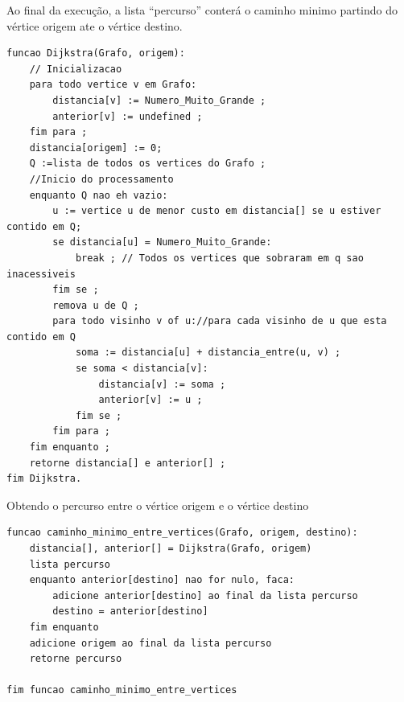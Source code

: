 \documentclass[a4paper,10pt]{article}
\newcommand{\code}[2]{
  \hrulefill
  \subsection*{#1}
  
  \vspace{2em}
}
\begin{document}
{Ao final da execução, a lista ``percurso'' conterá o caminho minimo partindo do vértice origem ate o vértice destino.
\begin{lstlisting}[morekeywords={*,:,:,[,], se, de, para, todo, fim para, enquanto, nao, eh, retorne}, captionpos=b]
funcao Dijkstra(Grafo, origem):
    // Inicializacao
    para todo vertice v em Grafo:
        distancia[v] := Numero_Muito_Grande ;
        anterior[v] := undefined ;
    fim para ;
    distancia[origem] := 0;
    Q :=lista de todos os vertices do Grafo ;
    //Inicio do processamento
    enquanto Q nao eh vazio:              
        u := vertice u de menor custo em distancia[] se u estiver contido em Q;   
        se distancia[u] = Numero_Muito_Grande:
            break ; // Todos os vertices que sobraram em q sao inacessiveis
        fim se ;
        remova u de Q ;
        para todo visinho v of u://para cada visinho de u que esta contido em Q
            soma := distancia[u] + distancia_entre(u, v) ;
            se soma < distancia[v]:  
                distancia[v] := soma ;
                anterior[v] := u ;
            fim se ;
        fim para ;
    fim enquanto ;
    retorne distancia[] e anterior[] ;
fim Dijkstra.
\end{lstlisting}

Obtendo o percurso entre o vértice origem e o vértice destino
\begin{lstlisting}[morekeywords={*,:,:,[,], se, de, para, todo, fim para, enquanto, nao, eh, retorne}, captionpos=b]
funcao caminho_minimo_entre_vertices(Grafo, origem, destino):
    distancia[], anterior[] = Dijkstra(Grafo, origem)
    lista percurso
    enquanto anterior[destino] nao for nulo, faca:
        adicione anterior[destino] ao final da lista percurso
        destino = anterior[destino]
    fim enquanto
    adicione origem ao final da lista percurso
    retorne percurso

fim funcao caminho_minimo_entre_vertices
\end{lstlisting}

}
\end{document}
